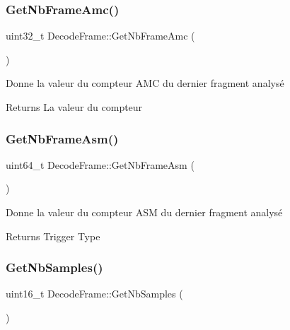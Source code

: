\subsubsection{\texorpdfstring{Get\+Nb\+Frame\+Amc()}{GetNbFrameAmc()}}
{\footnotesize\ttfamily uint32\+\_\+t Decode\+Frame\+::\+Get\+Nb\+Frame\+Amc (\begin{DoxyParamCaption}{ }\end{DoxyParamCaption})\hspace{0.3cm}{\ttfamily [inline]}}



Donne la valeur du compteur A\+MC du dernier fragment analysé 

\begin{DoxyReturn}{Returns}
La valeur du compteur 
\end{DoxyReturn}
\mbox{\label{classDecodeFrame_affbc2d0f3774cb4fff34b42c446a5955}} 
\subsubsection{\texorpdfstring{Get\+Nb\+Frame\+Asm()}{GetNbFrameAsm()}}
{\footnotesize\ttfamily uint64\+\_\+t Decode\+Frame\+::\+Get\+Nb\+Frame\+Asm (\begin{DoxyParamCaption}{ }\end{DoxyParamCaption})\hspace{0.3cm}{\ttfamily [inline]}}



Donne la valeur du compteur A\+SM du dernier fragment analysé 

\begin{DoxyReturn}{Returns}
Trigger Type 
\end{DoxyReturn}
\mbox{\label{classDecodeFrame_a97752547e2e402603dccf279928cd347}} 
\subsubsection{\texorpdfstring{Get\+Nb\+Samples()}{GetNbSamples()}}
{\footnotesize\ttfamily uint16\+\_\+t Decode\+Frame\+::\+Get\+Nb\+Samples (\begin{DoxyParamCaption}{ }\end{DoxyParamCaption})\hspace{0.3cm}{\ttfamily [inline]}}



